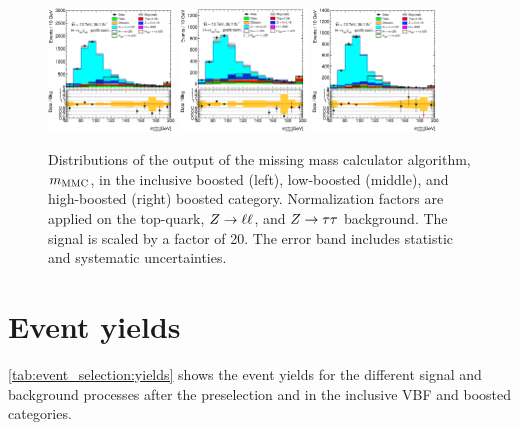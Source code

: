 \begin{figure}[htb]
    \centering
    \includegraphics[width=0.3\textwidth]{./plots/event_selection/ll-CutBoostedCat-dilep_mmc_mlm_m-lin.eps}
    \includegraphics[width=0.3\textwidth]{./plots/event_selection/ll-CutBoostedCatA-dilep_mmc_mlm_m-lin.eps}
    \includegraphics[width=0.3\textwidth]{./plots/event_selection/ll-CutBoostedCatB-dilep_mmc_mlm_m-lin.eps}
    \caption{Distributions of the output of the missing mass calculator algorithm, $m_\text{MMC}$, in the inclusive boosted (left),
             low-boosted (middle), and high-boosted (right) boosted category.
             Normalization factors are applied on the top-quark, $Z \to \ell \ell$, and $Z \to \tau \tau$ background.
             The signal is scaled by a factor of 20.
             The error band includes statistic and systematic uncertainties.}\label{fig:event_selection:boosted:mmc}
\end{figure}

\section{Event yields}\label{sec:event_selection:yields}

\cref{tab:event_selection:yields} shows the event yields for the different signal and background processes after
the preselection and in the inclusive VBF and boosted categories.

